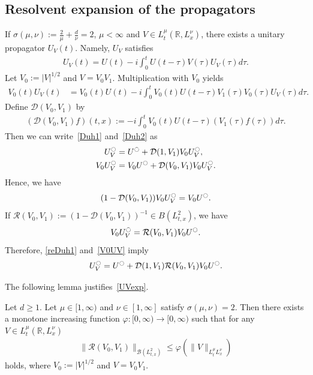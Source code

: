 \documentclass[10pt,a4paper]{amsart}
\newcommand{\CB}{\mathcal{B}}
\newcommand{\CD}{\mathcal{D}}
\newcommand{\CR}{\mathcal{R}}
\newcommand{\ph}{\varphi}
\newcommand{\ta}{\tau}
\newcommand{\si}{\sigma}
\newcommand{\I}{\infty}
\newcommand{\tx}{{t,x}}
\newcommand{\R}{\mathbb{R}}
\newcommand{\oc}{\ocircle}
\begin{document}
\subsection{Resolvent expansion of the propagators} If $\si(\mu,\nu):= \frac{2}{\mu}+\frac{d}{\nu}=2$, $\mu < \I$ and $V \in L^\mu_t(\R, L^\nu_x)$, there exists a unitary propagator $U_V(t)$. Namely, $U_V$ satisfies
\begin{align}\label{Duh1}
U_V(t) = U(t) - i \int_0^t U(t-\ta)V(\ta)U_V(\ta)d\ta.
\end{align}
Let $V_0 := |V|^{1/2}$ and $V = V_0V_1$. Multiplication with $V_0$ yields
\begin{align}\label{Duh2}
V_0(t) U_V(t) &= V_0(t) U(t) - i \int_0^t V_0(t)U(t-\ta)V_1(\ta)V_0(\ta)U_V(\ta)d\ta.
\end{align}
Define $\CD(V_0, V_1)$ by
\begin{align}\label{def of D}
(\CD(V_0, V_1)f)(t,x) := -i\int_0^t V_0(t)U(t-\ta)(V_1(\ta)f(\ta))d\ta.
\end{align}
Then we can write~\eqref{Duh1} and~\eqref{Duh2} as
\begin{align}
U_V^\ocircle &= U^\ocircle + \CD(1, V_1)V_0 U_V^\ocircle, \label{reDuh1}
\\
V_0 U_V^\ocircle &= V_0 U^\ocircle + \CD(V_0, V_1)V_0 U_V^\ocircle \nonumber.
\end{align}
Hence, we have
\begin{align}
(1 - \CD(V_0, V_1))V_0 U_V^\oc = V_0 U^\oc.
\end{align}
If $\CR(V_0, V_1) := (1-\CD(V_0, V_1))^{-1} \in B(L^2_{t,x})$, we have
\begin{align}\label{V0UV}
V_0 U_V^\oc = \CR(V_0, V_1) V_0 U^\oc.
\end{align}
Therefore, \eqref{reDuh1} and~\eqref{V0UV} imply
\begin{align}\label{UVexp}
U_V^\oc = U^\oc + \CD(1, V_1) \CR(V_0, V_1) V_0 U^\oc.
\end{align}

The following lemma justifies~\eqref{UVexp}.

\begin{lemm}\label{Resol est}
Let $d \geq 1$. Let $\mu \in [1,\I)$ and $\nu \in [1,\I]$ satisfy $\si(\mu,\nu)=2$. Then there exists a monotone increasing function $\ph:[0,\I) \to [0,\I)$ such that for any $V \in L^\mu_t (\R,L^\nu_x)$
\begin{align}
\|\CR(V_0, V_1)\|_{\CB\left(L^2_\tx\right)}
\leq \ph\left(\|V\|_{L^\mu_t L^\nu_x}\right)
\end{align}
holds, where $V_0 := |V|^{1/2}$ and $V = V_0 V_1$.
\end{lemm}
\end{document}
